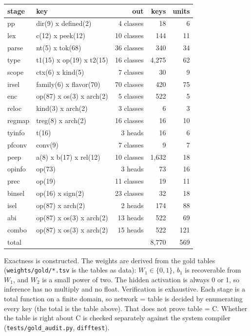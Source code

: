 \documentclass[11pt]{article}
\begin{document}
\begin{center}
\small
\begin{tabular}{llrrr}
\toprule
stage & key & out & keys & units \\
\midrule
pp & dir(9) x defined(2) & 4 classes & 18 & 6 \\
lex & c(12) x peek(12) & 10 classes & 144 & 11 \\
parse & nt(5) x tok(68) & 36 classes & 340 & 34 \\
type & t1(15) x op(19) x t2(15) & 16 classes & 4,275 & 62 \\
scope & ctx(6) x kind(5) & 7 classes & 30 & 9 \\
irsel & family(6) x flavor(70) & 70 classes & 420 & 75 \\
enc & op(87) x os(3) x arch(2) & 5 classes & 522 & 5 \\
reloc & kind(3) x arch(2) & 3 classes & 6 & 3 \\
regmap & treg(8) x arch(2) & 16 classes & 16 & 10 \\
tyinfo & t(16) & 3 heads & 16 & 6 \\
pfconv & conv(9) & 7 classes & 9 & 7 \\
peep & a(8) x b(17) x rel(12) & 10 classes & 1,632 & 18 \\
opinfo & op(73) & 3 heads & 73 & 16 \\
prec & op(19) & 11 classes & 19 & 11 \\
binsel & op(16) x sign(2) & 23 classes & 32 & 18 \\
isel & op(87) x arch(2) & 2 heads & 174 & 88 \\
abi & op(87) x os(3) x arch(2) & 13 heads & 522 & 69 \\
combo & op(87) x os(3) x arch(2) & 15 heads & 522 & 121 \\
\midrule
total & & & 8,770 & 569 \\
\bottomrule
\end{tabular}
\end{center}

Exactness is constructed. The weights are derived from the gold tables (\texttt{weights/gold/*.tsv} is the tables as data): $W_1\in\{0,1\}$, $b_1$ is recoverable from $W_1$, and $W_2$ is a small power of two. The hidden activation is always 0 or 1, so inference has no multiply and no float. Verification is exhaustive. Each stage is a total function on a finite domain, so network = table is decided by enumerating every key (the total is the table above). That does not prove table = C. Whether the table is right about C is checked separately against the system compiler (\texttt{tests/gold\_audit.py}, \texttt{difftest}).
\end{document}
